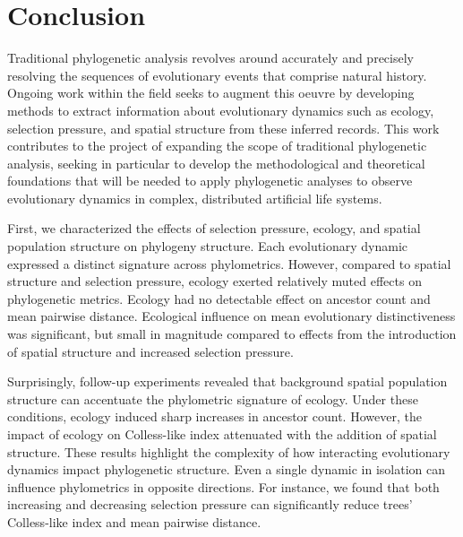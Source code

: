 \section{Conclusion} \label{sec:conclusion}

Traditional phylogenetic analysis revolves around accurately and precisely resolving the sequences of evolutionary events that comprise natural history. 
Ongoing work within the field seeks to augment this oeuvre by developing methods to extract information about evolutionary dynamics such as ecology, selection pressure, and spatial structure from these inferred records.
This work contributes to the project of expanding the scope of traditional phylogenetic analysis, seeking in particular to develop the methodological and theoretical foundations that will be needed to apply phylogenetic analyses to observe evolutionary dynamics in complex, distributed artificial life systems.

First, we characterized the effects of selection pressure, ecology, and spatial population structure on phylogeny structure.
Each evolutionary dynamic expressed a distinct signature across phylometrics.
However, compared to spatial structure and selection pressure, ecology exerted relatively muted effects on phylogenetic metrics.
Ecology had no detectable effect on ancestor count and mean pairwise distance.
Ecological influence on mean evolutionary distinctiveness was significant, but small in magnitude compared to effects from the introduction of spatial structure and increased selection pressure.

Surprisingly, follow-up experiments revealed that background spatial population structure can accentuate the phylometric signature of ecology.
Under these conditions, ecology induced sharp increases in ancestor count.
However, the impact of ecology on Colless-like index attenuated with the addition of spatial structure.
These results highlight the complexity of how interacting evolutionary dynamics  impact phylogenetic structure.
Even a single dynamic in isolation can influence phylometrics in opposite directions.
For instance, we found that both increasing and decreasing selection pressure can significantly reduce trees' Colless-like index and mean pairwise distance.

